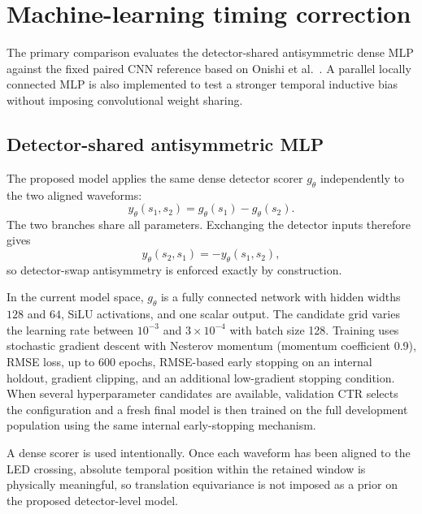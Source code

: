 \section{Machine-learning timing correction}

The primary comparison evaluates the detector-shared antisymmetric dense MLP against the fixed paired CNN reference based on Onishi et al.~\cite{onishi2022}. A parallel locally connected MLP is also implemented to test a stronger temporal inductive bias without imposing convolutional weight sharing.



\subsection{Detector-shared antisymmetric MLP}\label{sec:mlp-model}

The proposed model applies the same dense detector scorer \(g_\theta\) independently to the two aligned waveforms:
\begin{equation}\label{eq:mlp-correction}
    y_\theta(s_1,s_2)
    =
    g_\theta(s_1)-g_\theta(s_2).
\end{equation}
The two branches share all parameters. Exchanging the detector inputs therefore gives
\begin{equation}
    y_\theta(s_2,s_1)
    =
    -y_\theta(s_1,s_2),
\end{equation}
so detector-swap antisymmetry is enforced exactly by construction.

In the current model space, \(g_\theta\) is a fully connected network with hidden widths \(128\) and \(64\), SiLU activations, and one scalar output. The candidate grid varies the learning rate between \(10^{-3}\) and \(3\times10^{-4}\) with batch size 128. Training uses stochastic gradient descent with Nesterov momentum (momentum coefficient 0.9), RMSE loss, up to 600 epochs, RMSE-based early stopping on an internal holdout, gradient clipping, and an additional low-gradient stopping condition. When several hyperparameter candidates are available, validation CTR selects the configuration and a fresh final model is then trained on the full development population using the same internal early-stopping mechanism.

A dense scorer is used intentionally. Once each waveform has been aligned to the LED crossing, absolute temporal position within the retained window is physically meaningful, so translation equivariance is not imposed as a prior on the proposed detector-level model.


